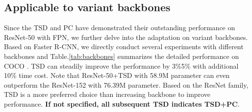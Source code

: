 \documentclass[10pt,twocolumn,letterpaper]{article}
\def \algname{TSD}
\def \loss{PC}
\begin{document}
\begin{table}[h]
\centering
\begin{center}
\end{center}
\caption{Results of \algname{} + \loss{} with variant backbones. DCN means deformable convolution. The runtime includes network forward and post-processing (e.g., NMS for object detection). The runtime is the averaged value on a single Tesla V100 GPU and CPU E5-2680 v4.}
\label{tab:backbones}
\end{table}


\subsection{Applicable to variant backbones}
Since the \algname{} and \loss{} have demonstrated their outstanding performance on ResNet-50 with FPN, we further delve into the adaptation on variant backbones.
Based on Faster R-CNN, we directly conduct several experiments with different backbones and Table.\ref{tab:backbones} summarizes the detailed performance on COCO .
TSD can steadily improve the performance by 3\%5\% with additional 10\% time cost. Note that ResNet-50+TSD with 58.9M parameter can even outperform the ResNet-152 with 76.39M parameter.
Based on the ResNet family, TSD is a more preferred choice than increasing backbone to improve performance.
\textbf{If not specified, all subsequent \algname{} indicates \algname{}+\loss{}}.
\end{document}
